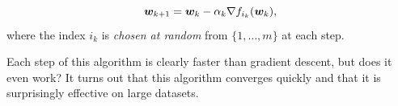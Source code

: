 \begin{equation*}
  \bm{w}_{k+1} = \bm{w}_k-\alpha_k \nabla f_{i_k}(\bm{w}_k),
\end{equation*}
where the index $i_k$ is {\em chosen at random} from $\{1,\dots,m\}$ at each step. 

Each step of this algorithm is clearly faster than gradient descent, but does it even work? It turns out that this algorithm converges quickly and that it is surprisingly effective on large datasets.


